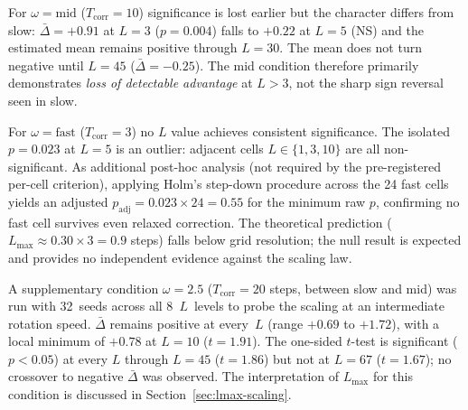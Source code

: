 \documentclass[sigconf,anonymous]{aamas}
\newcommand{\Dbar}{\bar{\Delta}}
\newcommand{\Lmax}{L_{\max}}
\newcommand{\Tcorr}{T_{\mathrm{corr}}}
\begin{document}
For $\omega{=}\text{mid}$ ($\Tcorr{=}10$) significance is lost
earlier but the character differs from slow: $\Dbar{=}{+}0.91$ at
$L{=}3$ ($p{=}0.004$) falls to $+0.22$ at $L{=}5$ (NS) and the
estimated mean remains positive through $L{=}30$.  The mean does
not turn negative until $L{=}45$ ($\Dbar{=}{-}0.25$).  The mid
condition therefore primarily demonstrates \emph{loss of detectable
advantage} at $L{>}3$, not the sharp sign reversal seen in slow.

For $\omega{=}\text{fast}$ ($\Tcorr{=}3$) no $L$ value achieves
consistent significance.  The isolated $p{=}0.023$ at $L{=}5$
is an outlier: adjacent cells $L{\in}\{1,3,10\}$ are all
non-significant.  As additional post-hoc analysis (not required
by the pre-registered per-cell criterion), applying Holm's
step-down procedure across the 24 fast cells yields an adjusted
$p_{\mathrm{adj}} = 0.023 \times 24 = 0.55$ for the minimum
raw $p$, confirming no fast cell survives even relaxed correction.
The theoretical prediction ($\Lmax \approx 0.30 \times 3 = 0.9$ steps)
falls below grid resolution; the null result is expected and provides
no independent evidence against the scaling law.

A supplementary condition $\omega{=}2.5$ ($\Tcorr{=}20$ steps,
between slow and mid) was run with 32~seeds across all 8~$L$~levels
to probe the scaling at an intermediate rotation speed.  $\Dbar$
remains positive at every~$L$ (range $+0.69$ to $+1.72$), with a
local minimum of $+0.78$ at $L{=}10$ ($t{=}1.91$).  The one-sided
$t$-test is significant ($p{<}0.05$) at every $L$ through $L{=}45$
($t{=}1.86$) but not at $L{=}67$ ($t{=}1.67$); no crossover to
negative $\Dbar$ was observed.  The interpretation of $\Lmax$ for
this condition is discussed in Section~\ref{sec:lmax-scaling}.
\end{document}
